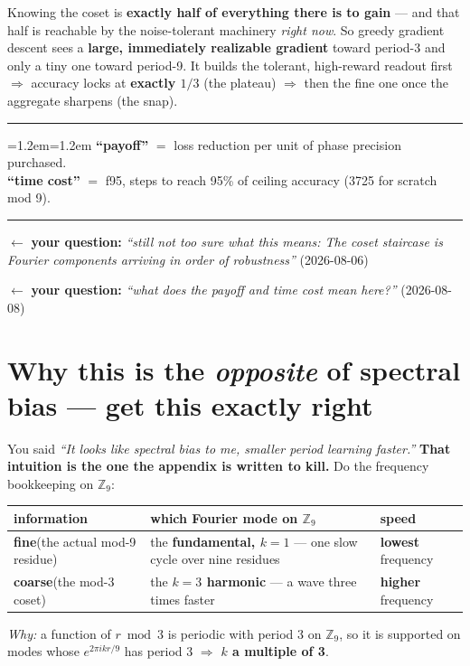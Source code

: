 \documentclass[11pt]{article}
\newcommand{\yourq}[2]{%
  \par\vspace{4pt}\noindent
  \textcolor{qcol}{$\leftarrow$ \textbf{your question:}
  \textit{``#1''}\; \textnormal{(#2)}}\par\vspace{4pt}}
\newenvironment{keybox}
  {\par\vspace{7pt}\noindent\hrule\vspace{5pt}%
   \begingroup\leftskip=1.2em\rightskip=1.2em\noindent\ignorespaces}
  {\par\endgroup\vspace{5pt}\hrule\vspace{7pt}}
\begin{document}
Knowing the coset is \textbf{exactly half of everything there is to gain} --- and
that half is reachable by the noise-tolerant machinery \emph{right now}. So greedy
gradient descent sees a \textbf{large, immediately realizable gradient} toward
period-3 and only a tiny one toward period-9. It builds the tolerant, high-reward
readout first $\Rightarrow$ accuracy locks at \textbf{exactly $1/3$} (the plateau)
$\Rightarrow$ then the fine one once the aggregate sharpens (the snap).

\begin{keybox}
\textbf{``payoff''} $=$ loss reduction per unit of phase precision purchased.\\
\textbf{``time cost''} $=$ f95, steps to reach 95\% of ceiling accuracy (3725 for
scratch mod 9).
\end{keybox}

\yourq{still not too sure what this means: The coset staircase is Fourier
components arriving in order of robustness}{2026-08-06}
\yourq{what does the payoff and time cost mean here?}{2026-08-08}

\section{Why this is the \emph{opposite} of spectral bias --- get this exactly right}
\label{sec:spectral}

You said \emph{``It looks like spectral bias to me, smaller period learning
faster.''} \textbf{That intuition is the one the appendix is written to kill.}
Do the frequency bookkeeping on $\mathbb{Z}_9$:

\begin{center}
\begin{tabular}{@{}p{4.0cm}p{5.6cm}p{3.1cm}@{}}
\toprule
\textbf{information} & \textbf{which Fourier mode on $\mathbb{Z}_9$} & \textbf{speed} \\
\midrule
\textbf{fine}\newline (the actual mod-9 residue) & the \textbf{fundamental, $k=1$} ---
  one slow cycle over nine residues & \textbf{lowest} frequency \\
\addlinespace
\textbf{coarse}\newline (the mod-3 coset) & the \textbf{$k=3$ harmonic} ---
  a wave three times faster & \textbf{higher} frequency \\
\bottomrule
\end{tabular}
\end{center}

\emph{Why:} a function of $r \bmod 3$ is periodic with period 3 on $\mathbb{Z}_9$,
so it is supported on modes whose $e^{2\pi i k r/9}$ has period 3
$\Rightarrow$ \textbf{$k$ a multiple of 3}.
\end{document}
